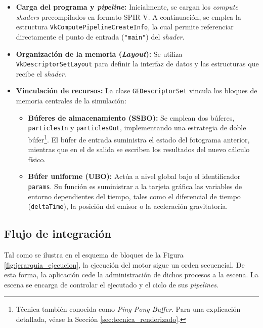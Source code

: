 \begin{itemize}
    \item \textbf{Carga del programa y \textit{pipeline}:} Inicialmente, se cargan los \textit{compute shaders} precompilados en formato SPIR-V. A continuación, se emplea la estructura \texttt{VkComputePipelineCreateInfo}, la cual permite referenciar directamente el punto de entrada (\texttt{"main"}) del \textit{shader}.
    
    \item \textbf{Organización de la memoria (\textit{Layout}):} Se utiliza \texttt{VkDescriptorSetLayout} para definir la interfaz de datos y las estructuras que recibe el \textit{shader}.
    
    \item \textbf{Vinculación de recursos:} La clase \texttt{GEDescriptorSet} vincula los bloques de memoria centrales de la simulación:
    \begin{itemize}
        \item \textbf{Búferes de almacenamiento (SSBO):} Se emplean dos búferes, \texttt{particlesIn} y \texttt{particlesOut}, implementando una estrategia de doble búfer\footnote{Técnica también conocida como \textit{Ping-Pong Buffer}. Para una explicación detallada, véase la Sección \ref{sec:tecnica_renderizado}.}. El búfer de entrada suministra el estado del fotograma anterior, mientras que en el de salida se escriben los resultados del nuevo cálculo físico.
        
        \item \textbf{Búfer uniforme (UBO):} Actúa a nivel global bajo el identificador \texttt{params}. Su función es suministrar a la tarjeta gráfica las variables de entorno dependientes del tiempo, tales como el diferencial de tiempo (\texttt{deltaTime}), la posición del emisor o la aceleración gravitatoria.
    \end{itemize}
\end{itemize}


\subsection{Flujo de integración}

Tal como se ilustra en el esquema de bloques de la Figura \ref{fig:jerarquia_ejecucion}, la ejecución del motor sigue un orden secuencial. 
De esta forma, la aplicación cede la administración de dichos procesos a la escena.  
La escena se encarga de controlar el ejecutado y el ciclo de sus \textit{pipelines}. 

